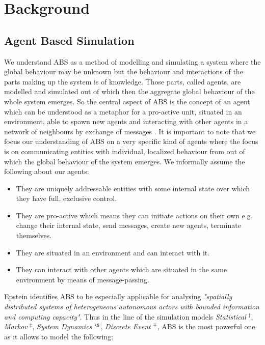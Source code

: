 \section{Background}

\subsection{Agent Based Simulation}
We understand ABS as a method of modelling and simulating a system where the global behaviour may be unknown but the behaviour and interactions of the parts making up the system is of knowledge. Those parts, called agents, are modelled and simulated out of which then the aggregate global behaviour of the whole system emerges. So the central aspect of ABS is the concept of an agent which can be understood as a metaphor for a pro-active unit, situated in an environment, able to spawn new agents and interacting with other agents in a network of neighbours by exchange of messages \cite{wooldridge_introduction_2009}. It is important to note that we focus our understanding of ABS on a very specific kind of agents where the focus is on communicating entities with individual, localized behaviour from out of which the global behaviour of the system emerges. We informally assume the following about our agents:

\begin{itemize}
	\item They are uniquely addressable entities with some internal state over which they have full, exclusive control.
	\item They are pro-active which means they can initiate actions on their own e.g. change their internal state, send messages, create new agents, terminate themselves.
	\item They are situated in an environment and can interact with it.
	\item They can interact with other agents which are situated in the same environment by means of message-passing.
\end{itemize} 

Epstein \cite{epstein_generative_2012} identifies ABS to be especially applicable for analysing \textit{"spatially distributed systems of heterogeneous autonomous actors with bounded information and computing capacity"}. Thus in the line of the simulation models \textit{Statistical} $^\dag$, \textit{Markov} $^\ddag$, \textit{System Dynamics} $^\S$, \textit{Discrete Event} $^\mp$, ABS is the most powerful one as it allows to model  the following:

